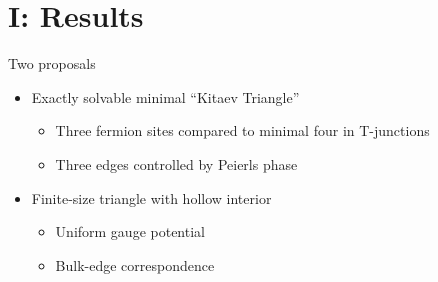 \documentclass[xcolor=dvipsnames,10pt,aspectratio=169]{beamer}
\newcommand{\RE}{Results}
\begin{document}
  \section{I: \RE}

  \begin{frame}{Two proposals}
    \begin{itemize}
      \item Exactly solvable minimal ``Kitaev Triangle''
        \begin{itemize}
          \item Three fermion sites compared to minimal four in T-junctions
          \item Three edges controlled by Peierls phase
        \end{itemize}
      \pause
      \item Finite-size triangle with hollow interior
        \begin{itemize}
          \item Uniform gauge potential
          \item Bulk-edge correspondence
        \end{itemize}
    \end{itemize}
  \end{frame}
\end{document}
